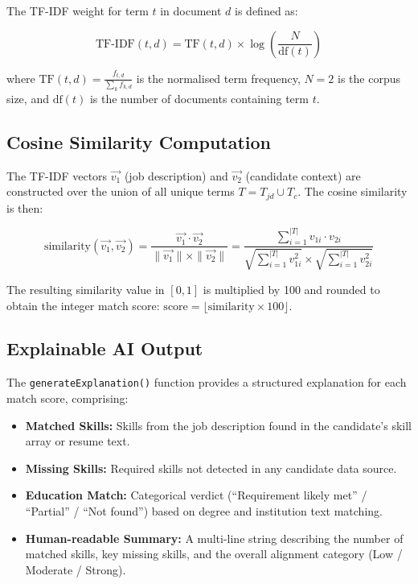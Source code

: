 \documentclass[12pt,a4paper]{report}
\begin{document}
The TF-IDF weight for term $t$ in document $d$ is defined as:

\begin{equation}
    \text{TF-IDF}(t, d) = \text{TF}(t, d) \times \log\!\left(\frac{N}{\text{df}(t)}\right)
\end{equation}

where $\text{TF}(t, d) = \frac{f_{t,d}}{\sum_k f_{k,d}}$ is the normalised term frequency, $N = 2$ is the corpus size, and $\text{df}(t)$ is the number of documents containing term $t$.

\subsection{Cosine Similarity Computation}

The TF-IDF vectors $\vec{v_1}$ (job description) and $\vec{v_2}$ (candidate context) are constructed over the union of all unique terms $T = T_{jd} \cup T_c$. The cosine similarity is then:

\begin{equation}
    \text{similarity}(\vec{v_1}, \vec{v_2}) = \frac{\vec{v_1} \cdot \vec{v_2}}{\|\vec{v_1}\| \times \|\vec{v_2}\|}
    = \frac{\sum_{i=1}^{|T|} v_{1i} \cdot v_{2i}}
           {\sqrt{\sum_{i=1}^{|T|} v_{1i}^2} \times \sqrt{\sum_{i=1}^{|T|} v_{2i}^2}}
\end{equation}

The resulting similarity value in $[0, 1]$ is multiplied by 100 and rounded to obtain the integer match score: $\text{score} = \lfloor\text{similarity} \times 100\rfloor$.

\subsection{Explainable AI Output}

The \texttt{generateExplanation()} function provides a structured explanation for each match score, comprising:
\begin{itemize}[leftmargin=*, itemsep=2pt]
    \item \textbf{Matched Skills:} Skills from the job description found in the candidate's skill array or resume text.
    \item \textbf{Missing Skills:} Required skills not detected in any candidate data source.
    \item \textbf{Education Match:} Categorical verdict (``Requirement likely met'' / ``Partial'' / ``Not found'') based on degree and institution text matching.
    \item \textbf{Human-readable Summary:} A multi-line string describing the number of matched skills, key missing skills, and the overall alignment category (Low / Moderate / Strong).
\end{itemize}
\end{document}

